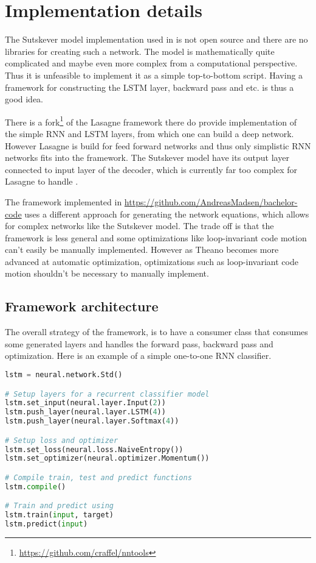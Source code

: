 \chapter{Implementation details}
\label{appendix:implementation}

The Sutskever model implementation used in \cite{sutskever} is not open source and there are no libraries for creating such a network. The model is mathematically quite complicated and maybe even more complex from a computational perspective. Thus it is unfeasible to implement it as a simple top-to-bottom script. Having a framework for constructing the LSTM layer, backward pass and etc. is thus a good idea.

There is a fork\footnote{\url{https://github.com/craffel/nntools}} of the Lasagne framework there do provide implementation of the simple RNN and LSTM layers, from which one can build a deep network. However Lasagne is build for feed forward networks and thus only simplistic RNN networks fits into the framework. The Sutskever model have its output layer connected to input layer of the decoder, which is currently far too complex for Lasagne to handle \cite{lasagne-issue}.

The framework implemented in \url{https://github.com/AndreasMadsen/bachelor-code} uses a different approach for generating the network equations, which allows for complex networks like the Sutskever model. The trade off is that the framework is less general and some optimizations like loop-invariant code motion can't easily be manually implemented.  However as Theano becomes more advanced at automatic optimization, optimizations such as loop-invariant code motion shouldn't be necessary to manually implement.

\section{Framework architecture}

The overall strategy of the framework, is to have a consumer class that consumes some generated layers and handles the forward pass, backward pass and optimization. Here is an example of a simple one-to-one RNN classifier. 

\begin{lstlisting}[language=Python]
lstm = neural.network.Std()

# Setup layers for a recurrent classifier model
lstm.set_input(neural.layer.Input(2))
lstm.push_layer(neural.layer.LSTM(4))
lstm.push_layer(neural.layer.Softmax(4))

# Setup loss and optimizer
lstm.set_loss(neural.loss.NaiveEntropy())
lstm.set_optimizer(neural.optimizer.Momentum())

# Compile train, test and predict functions
lstm.compile()

# Train and predict using
lstm.train(input, target)
lstm.predict(input)
\end{lstlisting}

